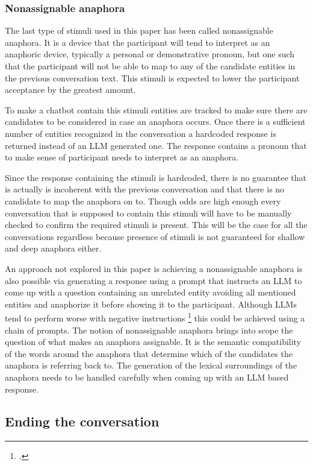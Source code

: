 \documentclass[12pt]{report}
\begin{document}
{\subsubsection{Nonassignable anaphora}

The last type of stimuli used in this paper
has been called nonassignable anaphora.
It is a device that the participant will tend to
interpret as an anaphoric device,
typically a personal or demonstrative pronoun,
but one such that the participant will not be able
to map to any of the candidate entities
in the previous conversation text.
This stimuli is expected to lower the participant acceptance
by the greatest amount.

To make a chatbot contain this stimuli
entities are tracked to make sure
there are candidates to be considered
in case an anaphora occurs.
Once there is a sufficient number of
entities recognized in the conversation
a hardcoded response is returned instead of an LLM generated one.
The response contains a pronoun that to make sense of
participant needs to interpret as an anaphora.

Since the response containing the stimuli is hardcoded,
there is no guarantee
that is actually is incoherent with the previous conversation
and that there is no candidate to map the anaphora on to.
Though odds are high enough
every conversation that is supposed to contain this stimuli
will have to be manually checked
to confirm the required stimuli is present.
This will be the case for all the conversations regardless
because presence of stimuli is not guaranteed
for shallow and deep anaphora either.

An approach not explored in this paper is
achieving a nonassignable anaphora is also possible
via generating a response
using a prompt that instructs an LLM
to come up with a question containing an unrelated entity
avoiding all mentioned entities
and anaphorize it before showing it to the participant.
Although LLMs tend to perform worse with negative instructions \footcite{negated_prompts}
this could be achieved using a chain of prompts.
The notion of nonassignable anaphora
brings into scope the question of
what makes an anaphora assignable.
It is the semantic compatibility of the words around the anaphora
that determine which of the candidates the anaphora is referring back to.
The generation of the lexical surroundings of the anaphora
needs to be handled carefully
when coming up with an LLM based response.

\subsection{Ending the conversation}

}
\end{document}
